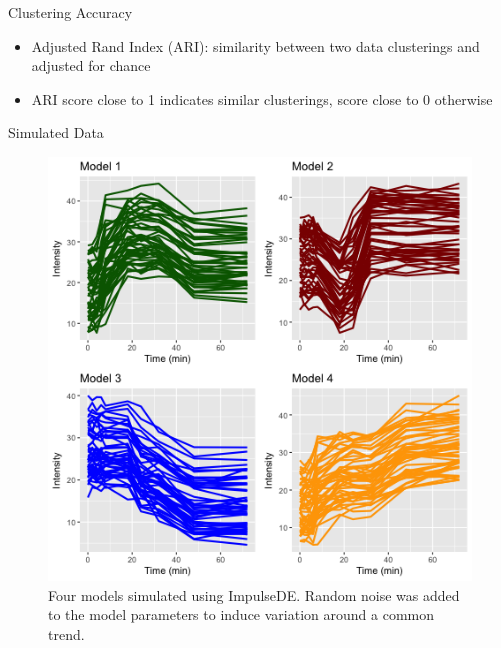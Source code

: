 \documentclass[10pt]{beamer}
\begin{document}


\begin{frame}{Clustering Accuracy}
\begin{itemize}
\item  Adjusted Rand Index (ARI): similarity between two data clusterings and adjusted for chance 
\item  ARI score close to 1 indicates similar clusterings, score close to 0 otherwise
\end{itemize}
\end{frame}


\begin{frame}{Simulated Data}
\begin{figure}
     \includegraphics[width=0.65\linewidth]{Simulation_plot.png}
      \caption{Four models simulated using ImpulseDE. Random noise was added to the model parameters to induce variation around a common trend.}
       \label{fig:simdata}
    \end{figure}
\end{frame}
\end{document}
